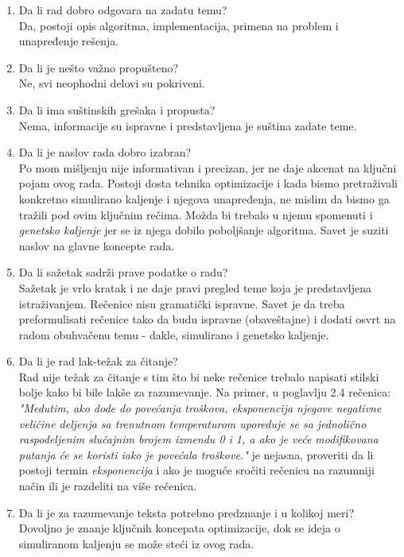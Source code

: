 \documentclass[a4paper]{report}
\begin{document}
\begin{enumerate}
	\item Da li rad dobro odgovara na zadatu temu?\\Da, postoji opis algoritma, implementacija, primena na problem i unapređenje rešenja.
	\item Da li je nešto važno propušteno?\\
	Ne, svi neophodni delovi su pokriveni.
	\item Da li ima suštinskih grešaka i propusta?\\
	Nema, informacije su ispravne i predstavljena je suština zadate teme.
	\item Da li je naslov rada dobro izabran?\\ 
	Po mom mišljenju nije informativan i precizan, jer ne daje akcenat na ključni pojam ovog rada. Postoji dosta tehnika optimizacije i kada bismo pretraživali konkretno simulirano kaljenje i njegova unapređenja, ne mislim da bismo ga tražili pod ovim ključnim rečima. Možda bi trebalo u njemu spomenuti i \textit{genetsko kaljenje} jer se iz njega dobilo poboljšanje algoritma. Savet je suziti naslov na glavne koncepte rada.
	\item Da li sažetak sadrži prave podatke o radu?\\
	Sažetak je vrlo kratak i ne daje pravi pregled teme koja je predstavljena istraživanjem. Rečenice nisu gramatički ispravne. Savet je da treba preformulisati rečenice tako da budu ispravne (obaveštajne) i dodati osvrt na radom obuhvačenu temu - dakle, simulirano i genetsko kaljenje. 
	\item Da li je rad lak-težak za čitanje?\\ 
	Rad nije težak za čitanje s tim što bi neke rečenice trebalo napisati stilski bolje kako bi bile lakše za razumevanje. \newline
	Na primer, u poglavlju 2.4 rečenica: \textit{"Medutim, ako dode do povećanja troškova, eksponencija njegove negativne veličine deljenja sa trenutnom temperaturom uporeduje se sa
		jednolično raspodeljenim slučajnim brojem izmendu 0 i 1, a ako je veće modifikovana putanja će se koristi iako je povećala troškove."} je nejasna, proveriti da li postoji termin \textit{eksponencija} i ako je moguće sročiti rečenicu na razumniji način ili je razdeliti na više rečenica.
	\item Da li je za razumevanje teksta potrebno predznanje i u kolikoj meri?\\ 
	Dovoljno je znanje ključnih koncepata optimizacije, dok se  ideja o simuliranom kaljenju se može steći iz ovog rada.

\end{enumerate}
\end{document}
